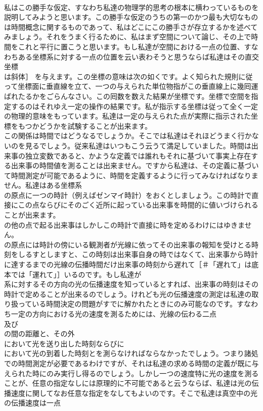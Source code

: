 \documentclass[8pt]{extreport}
\begin{document}
\begin{CJK}{UTF8}{min}
\\	私はこの勝手な仮定、すなわち私達の物理学的思考の根本に横わっているものを説明してみようと思います。この勝手な仮定のうちの第一のかつ最も大切なものは時間概念に関するものであって、私はどこにこの勝手さが存立するかを述べてみましょう。それをうまく行るために、私はまず空間について論じ、その上で時間をこれと平行に置こうと思います。もし私達が空間における一点の位置、すなわちある坐標系に対する一点の位置を云い表わそうと思うならば私達はその直交坐標 
\\	は斜体］ を与えます。この坐標の意味は次の如くです。よく知られた規則に従って坐標面に垂直線を立て、一つの与えられた単位物指がこの垂直線上に幾囘運ばれたるかをごらんなさい。この囘数を数えた結果が坐標です。坐標で空間を指定するのはそれゆえ一定の操作の結果です。私が指示する坐標は従って全く一定の物理的意味をもっています。私達は一定の与えられた点が実際に指示された坐標をもつかどうかを試験することが出来ます。
\\	この関係は時間ではどうなるでしょうか。そこでは私達はそれほどうまく行かないのを見るでしょう。従来私達はいつもこう云うて満足していました。時間は出来事の独立変数であると、かような定義では誰れもそれに基づいて事実上存在する出来事の時間値を測ることは出来ません。ですから私達は、その定義に基づいて時間測定が可能であるように、時間を定義するように行ってみなければなりません。私達はある坐標系 
\\	の原点に一つの時計（例えばゼンマイ時計）をおくとしましょう。この時計で直接にこの点ならびにそのごく近所に起っている出来事を時間的に値いづけられることが出来ます。
\\	の他の点で起る出来事はしかしこの時計で直接に時を定めるわけにはゆきません。
\\	の原点には時計の傍にいる観測者が光線に依ってその出来事の報知を受けとる時刻をしるすとしますと、この時刻は出来事自身の時ではなくて、出来事から時計に達するまでの光線の伝播時間だけ出来事の時刻から遅れて［＃「遅れて」は底本では「運れて」］いるのです。もし私達が 
\\	系に対するその方向の光の伝播速度を知っているとすれば、出来事の時刻はその時計で定めることが出来るのでしょう。けれども光の伝播速度の測定は私達の取り扱っている時間決定の問題がすでに解かれたときにのみ可能なのです。すなわち一定の方向における光の速度を測るためには、光線の伝わる二点 
\\	及び 
\\	の間の距離と、その外 
\\	において光を送り出した時刻ならびに 
\\	において光の到着した時刻とを測らなければならなかったでしょう。つまり諸処での時間測定が必要であるわけですが、それは私達の求める時間の定義が既に与えられた時にのみ実行し得るのでしょう。しかし一つの速度特に光の速度を測ることが、任意の指定なしには原理的に不可能であると云うならば、私達は光の伝播速度に関してなお任意な指定をなしてもよいのです。そこで私達は真空中の光の伝播速度は一点 

\end{CJK}
\end{document}
